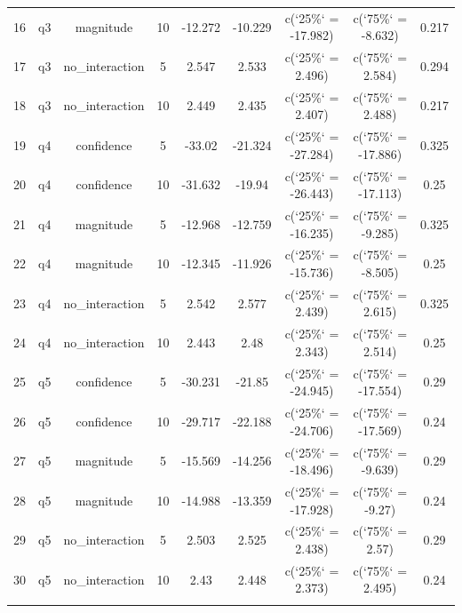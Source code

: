 \begin{table}[!htbp]
\begin{tabular}{@{\extracolsep{5pt}} ccccccccc}
16 & q3 & magnitude & 10 & -12.272 & -10.229 & c(`25\%` = -17.982) & c(`75\%` = -8.632) & 0.217 \\ 
17 & q3 & no\_interaction & 5 & 2.547 & 2.533 & c(`25\%` = 2.496) & c(`75\%` = 2.584) & 0.294 \\ 
18 & q3 & no\_interaction & 10 & 2.449 & 2.435 & c(`25\%` = 2.407) & c(`75\%` = 2.488) & 0.217 \\ 
19 & q4 & confidence & 5 & -33.02 & -21.324 & c(`25\%` = -27.284) & c(`75\%` = -17.886) & 0.325 \\ 
20 & q4 & confidence & 10 & -31.632 & -19.94 & c(`25\%` = -26.443) & c(`75\%` = -17.113) & 0.25 \\ 
21 & q4 & magnitude & 5 & -12.968 & -12.759 & c(`25\%` = -16.235) & c(`75\%` = -9.285) & 0.325 \\ 
22 & q4 & magnitude & 10 & -12.345 & -11.926 & c(`25\%` = -15.736) & c(`75\%` = -8.505) & 0.25 \\ 
23 & q4 & no\_interaction & 5 & 2.542 & 2.577 & c(`25\%` = 2.439) & c(`75\%` = 2.615) & 0.325 \\ 
24 & q4 & no\_interaction & 10 & 2.443 & 2.48 & c(`25\%` = 2.343) & c(`75\%` = 2.514) & 0.25 \\ 
25 & q5 & confidence & 5 & -30.231 & -21.85 & c(`25\%` = -24.945) & c(`75\%` = -17.554) & 0.29 \\ 
26 & q5 & confidence & 10 & -29.717 & -22.188 & c(`25\%` = -24.706) & c(`75\%` = -17.569) & 0.24 \\ 
27 & q5 & magnitude & 5 & -15.569 & -14.256 & c(`25\%` = -18.496) & c(`75\%` = -9.639) & 0.29 \\ 
28 & q5 & magnitude & 10 & -14.988 & -13.359 & c(`25\%` = -17.928) & c(`75\%` = -9.27) & 0.24 \\ 
29 & q5 & no\_interaction & 5 & 2.503 & 2.525 & c(`25\%` = 2.438) & c(`75\%` = 2.57) & 0.29 \\ 
30 & q5 & no\_interaction & 10 & 2.43 & 2.448 & c(`25\%` = 2.373) & c(`75\%` = 2.495) & 0.24 \\ 
\hline \\[-1.8ex] 
\end{tabular} 
\end{table} 
